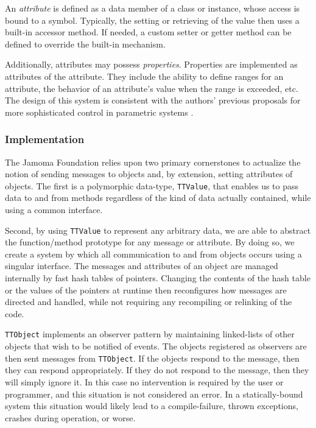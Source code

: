 \documentclass[twoside,10pt]{article}
\begin{document}
An \emph{attribute} is defined as a data member of a class or instance, whose access is bound to a symbol.  Typically, the setting or retrieving of the value then uses a built-in accessor method.  If needed, a custom setter or getter method can be defined to override the built-in mechanism.

Additionally, attributes may possess \emph{properties}.  Properties are implemented as attributes of the attribute.  They include the ability to define ranges for an attribute, the behavior of an attribute's value when the range is exceeded, etc.  The design of this system is consistent with the authors' previous proposals for more sophisticated control in parametric systems \cite{Place:2008params}.

\subsubsection{Implementation}

The Jamoma Foundation relies upon two primary cornerstones to actualize the notion of sending messages to objects and, by extension, setting attributes of objects.  The first is a polymorphic data-type, \texttt{\small{TTValue}}, that enables us to pass data to and from methods regardless of the kind of data actually contained, while using a common interface.  %

Second, by using \texttt{\small{TTValue}} to represent any arbitrary data, we are able to abstract the function/method prototype for any message or attribute.  By doing so, we create a system by which all communication to and from objects occurs using a singular interface.  The messages and attributes of an object are managed internally by fast hash tables of pointers.  Changing the contents of the hash table or the values of the pointers at runtime then reconfigures how messages are directed and handled, while not requiring any recompiling or relinking of the code.

\texttt{\small{TTObject}} implements an observer pattern by maintaining linked-lists of other objects that wish to be notified of events.  The objects registered as observers are then sent messages from \texttt{\small{TTObject}}.  If the objects respond to the message, then they can respond appropriately.  If they do not respond to the message, then they will simply ignore it.  In this case no intervention is required by the user or programmer, and this situation is not considered an error.  In a statically-bound system this situation would likely lead to a compile-failure, thrown exceptions, crashes during operation, or worse.
\end{document}
